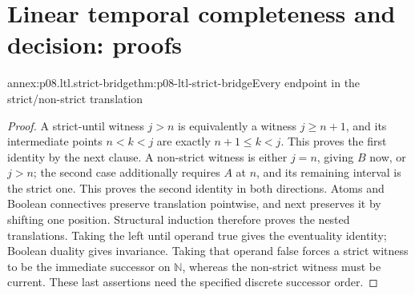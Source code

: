 \section{Linear temporal completeness and decision: proofs}
\label{sec:annex-p08-linear-temporal-completeness}

\begin{annexitem}{annex:p08.ltl.strict-bridge}{thm:p08-ltl-strict-bridge}{Every endpoint in the strict/non-strict translation}
\begin{proof}
A strict-until witness \(j>n\) is equivalently a witness
\(j\geq n+1\), and its intermediate points \(n<k<j\) are
exactly \(n+1\leq k<j\). This proves the first identity by the
next clause. A non-strict witness is either \(j=n\), giving
\(B\) now, or \(j>n\); the second case additionally requires
\(A\) at \(n\), and its remaining interval is the strict one.
This proves the second identity in both directions. Atoms and
Boolean connectives preserve translation pointwise, and next
preserves it by shifting one position. Structural induction
therefore proves the nested translations. Taking the left until
operand true gives the eventuality identity; Boolean duality gives
invariance. Taking that operand false forces a strict witness to
be the immediate successor on \(\mathbb N\), whereas the
non-strict witness must be current. These last assertions need
the specified discrete successor order.
\end{proof}
\end{annexitem}

